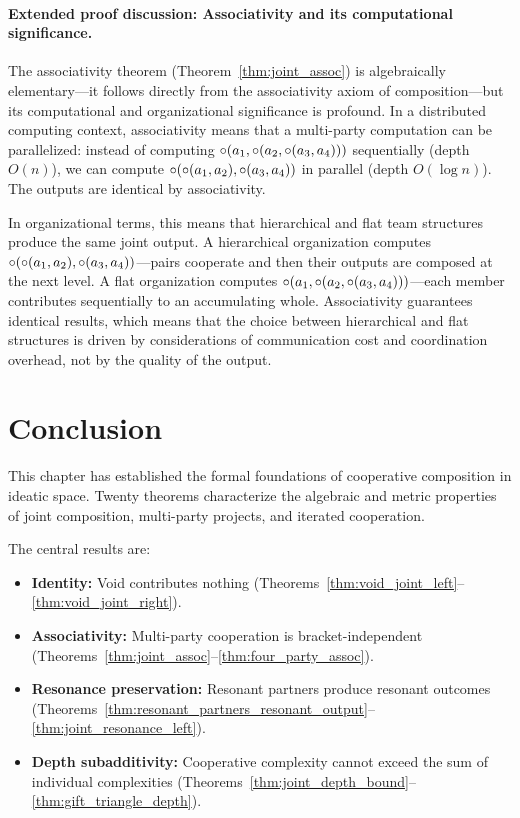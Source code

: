 \paragraph{Extended proof discussion: Associativity and its
computational significance.}
The associativity theorem (Theorem~\ref{thm:joint_assoc}) is
algebraically elementary---it follows directly from the associativity
axiom of composition---but its computational and organizational
significance is profound.  In a distributed computing context,
associativity means that a multi-party computation can be parallelized:
instead of computing $\circ(a_1, \circ(a_2, \circ(a_3,
a_4)))$ sequentially (depth $O(n)$), we can compute
$\circ(\circ(a_1, a_2), \circ(a_3, a_4))$ in parallel
(depth $O(\log n)$).  The outputs are identical by associativity.

In organizational terms, this means that hierarchical and flat team
structures produce the same joint output.  A hierarchical organization
computes $\circ(\circ(a_1, a_2), \circ(a_3, a_4))$---pairs
cooperate and then their outputs are composed at the next level.  A
flat organization computes $\circ(a_1, \circ(a_2, \circ(a_3,
a_4)))$---each member contributes sequentially to an accumulating
whole.  Associativity guarantees identical results, which means that
the choice between hierarchical and flat structures is driven by
considerations of communication cost and coordination overhead, not
by the quality of the output.

\section{Conclusion}
\label{sec:ch16-concl}

This chapter has established the formal foundations of cooperative
composition in ideatic space.  Twenty theorems characterize the algebraic
and metric properties of joint composition, multi-party projects, and
iterated cooperation.

The central results are:
\begin{itemize}
  \item \textbf{Identity:} Void contributes nothing
    (Theorems~\ref{thm:void_joint_left}--\ref{thm:void_joint_right}).
  \item \textbf{Associativity:} Multi-party cooperation is bracket-independent
    (Theorems~\ref{thm:joint_assoc}--\ref{thm:four_party_assoc}).
  \item \textbf{Resonance preservation:} Resonant partners produce resonant
    outcomes (Theorems~\ref{thm:resonant_partners_resonant_output}--\ref{thm:joint_resonance_left}).
  \item \textbf{Depth subadditivity:} Cooperative complexity cannot exceed
    the sum of individual complexities (Theorems~\ref{thm:joint_depth_bound}--\ref{thm:gift_triangle_depth}).
\end{itemize}

